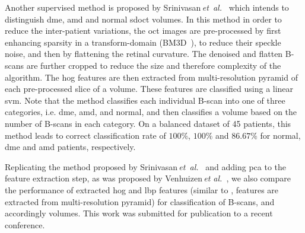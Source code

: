 Another supervised method is proposed by Srinivasan\,\textit{et~al.}~\cite{Srinivasan2014} which intends to distinguish \gls{dme}, \gls{amd} and normal \gls{sdoct} volumes. 
In this method in order to reduce the inter-patient variations, the \gls{oct} images are pre-processed by first enhancing sparsity in a transform-domain (BM3D~\cite{dabov2007image}), to reduce their speckle noise, and then by flattening the retinal curvature. 
The denoised and flatten B-scans are further cropped to reduce the size and therefore complexity of the algorithm. 
The \gls{hog} features are then extracted from multi-resolution pyramid of each pre-processed slice of a volume. 
These features are classified using a linear \gls{svm}.  
Note that the method classifies each individual B-scan into one of three categories, i.e. \gls{dme}, \gls{amd}, and normal, and then classifies a volume based on the number of B-scans in each category. 
On a balanced dataset of 45 patients, this method leads to correct classification rate of $100 \%$, $100 \%$ and $86.67 \%$ for normal, \gls{dme} and \gls{amd} patients, respectively.


Replicating the method proposed by Srinivasan\,\textit{et~al.}~\cite{Srinivasan2014} and adding \gls{pca} to the feature extraction step, as was proposed by Venhuizen\,\textit{et al.}~\cite{Venhuizen2015}, we also compare the performance of extracted \gls{hog} and \gls{lbp} features (similar to \cite{Srinivasan2014}, features are extracted from multi-resolution pyramid) for classification of B-scans, and accordingly volumes. 
{\color{red}This work was submitted for publication to a recent conference.} 

